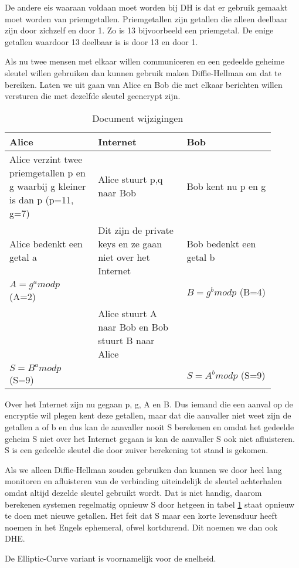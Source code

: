 De andere eis waaraan voldaan moet worden bij DH is dat er gebruik gemaakt moet worden van priemgetallen. Priemgetallen zijn getallen die alleen deelbaar zijn door zichzelf en door 1. Zo is 13 bijvoorbeeld een priemgetal. De enige getallen waardoor 13 deelbaar is is door 13 en door 1.

Als nu twee mensen met elkaar willen communiceren en een gedeelde geheime sleutel willen gebruiken dan kunnen gebruik maken Diffie-Hellman om dat te bereiken. Laten we uit gaan van Alice en Bob die met elkaar berichten willen versturen die met dezelfde sleutel geencrypt zijn.

\begin{flushleft}
\begin{table}[h!]
\centering
	\begin{tabularx}{\textwidth}{ |p{0.3\linewidth}|p{0.3\linewidth}|p{0.3\linewidth}| }
\hline
	Alice &
	Internet &
	Bob\\
\hline
	Alice verzint twee priemgetallen p en g waarbij g kleiner is dan p (p=11, g=7)&
	Alice stuurt p,q naar Bob &
	Bob kent nu p en g\\
\hline
	Alice bedenkt een getal a &
	Dit zijn de private keys en ze gaan niet over het Internet &
	Bob bedenkt een getal b\\
\hline
	$A = g^a mod p$ (A=2)&
	&
	$B = g^b mod p$ (B=4)\\
\hline
	&
	Alice stuurt A naar Bob en Bob stuurt B naar Alice &
	\\
\hline
	$S = B^a mod p$ (S=9)&
	&
	$S = A^b mod p$ (S=9)\\
\hline
\end{tabularx}
\caption{Document wijzigingen}
\label{table:DH}
\end{table}
\end{flushleft}

Over het Internet zijn nu gegaan p, g, A en B. Dus iemand die een aanval op de encryptie wil plegen kent deze getallen, maar dat die aanvaller niet weet zijn de getallen a of b en dus kan de aanvaller nooit S berekenen en omdat het gedeelde geheim S niet over het Internet gegaan is kan de aanvaller S ook niet afluisteren. S is een gedeelde sleutel die door zuiver berekening tot stand is gekomen.

Als we alleen Diffie-Hellman zouden gebruiken dan kunnen we door heel lang monitoren en afluisteren van de verbinding uiteindelijk de sleutel achterhalen omdat altijd dezelde sleutel gebruikt wordt. Dat is niet handig, daarom berekenen systemen regelmatig opnieuw S door hetgeen in tabel \ref{table:DH} staat opnieuw te doen met nieuwe getallen. Het feit dat S maar een korte levensduur heeft noemen in het Engels ephemeral, ofwel kortdurend. Dit noemen we dan ook DHE.

De Elliptic-Curve variant is voornamelijk voor de snelheid.
